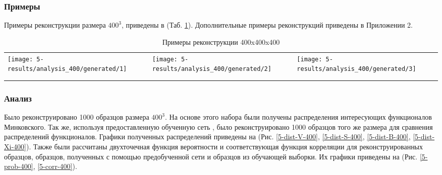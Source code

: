 		\subsubsection{Примеры}
			Примеры реконструкции размера $400^3$, приведены в (Таб. \ref{5-gen-400}). Дополнительные примеры реконструкций приведены в Приложении 2.
			
			\begin{table}[h!]
				\begin{center}
					\begin{tabular}{p{5cm} p{5cm} p{5cm}}
						\toprule
						\texttt{[image: 5-results/analysis\_400/generated/1]}
						&
						\texttt{[image: 5-results/analysis\_400/generated/2]}
						&
						\texttt{[image: 5-results/analysis\_400/generated/3]}
						\\
						&
						&
						\\
						&
						&
						\\
						\bottomrule
					\end{tabular}
					\caption{Примеры реконструкции 400x400x400}
					\label{5-gen-400}
				\end{center}
			\end{table} 
	
		\subsubsection{Анализ}
			Было реконструировано 1000 образцов размера $400^3$. На основе этого набора были получены распределения интересующих функционалов Минковского. Так же, используя предоставленную обученную сеть \cite{Mosser}, было реконструировано 1000 образцов того же размера для сравнения распределений функционалов. Графики полученных распределений приведены на (Рис. \ref{5-dist-V-400}, \ref{5-dist-S-400}, \ref{5-dist-B-400}, \ref{5-dist-Xi-400}). Также были рассчитаны двухточечная функция вероятности и соответствующая функция корреляции для реконструированных образцов, образцов, полученных с помощью предобученной сети \cite{Mosser} и образцов из обучающей выборки. Их графики приведены на (Рис. \ref{5-prob-400}, \ref{5-corr-400}).
			
